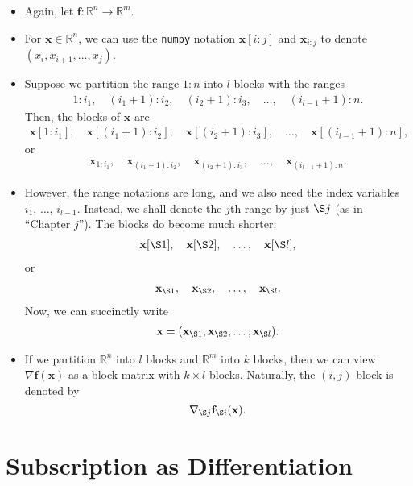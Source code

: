 \documentclass[10pt]{article}
\newcommand{\ve}[1]{\mathbf{#1}}
\newcommand{\Real}{\mathbb{R}}
\begin{document}
\begin{itemize}
  \item Again, let $\ve{f}: \Real^n \rightarrow \Real^m$. 
  
  \item For $\ve{x} \in \Real^n$, we can use the {\tt numpy} notation $\ve{x}[i:j]$ and $\ve{x}_{i:j}$ to denote $(x_i, x_{i+1}, \dotsc, x_j)$.
  
  \item Suppose we partition the range $1:n$ into $l$ blocks with the ranges
  \begin{align*}
    1:i_1, \quad (i_1+1):i_2, \quad (i_2+1):i_3, \quad \dotsc, \quad (i_{l-1}+1):n.
  \end{align*}
  Then, the blocks of $\ve{x}$ are
  \begin{align*}
    \ve{x}[1:i_1], \quad \ve{x}[(i_1+1):i_2], \quad \ve{x}[(i_2+1):i_3], \quad \dotsc, \quad \ve{x}[(i_{l-1}+1):n],
  \end{align*}
  or 
  \begin{align*}
    \ve{x}_{1:i_1}, \quad \ve{x}_{(i_1+1):i_2}, \quad \ve{x}_{(i_2+1):i_3}, \quad \dotsc, \quad \ve{x}_{(i_{l-1}+1):n}.
  \end{align*}

  \item However, the range notations are long, and we also need the index variables $i_1$, $\dotsc$, $i_{l-1}$. Instead, we shall denote the $j$th range by just $\S j$ (as in ``Chapter $j$''). The blocks do become much shorter:
  \begin{align*}
    \ve{x}[\S 1], \quad \ve{x}[\S 2], \quad \dotsc, \quad \ve{x}[\S l], 
  \end{align*}
  or 
  \begin{align*}
    \ve{x}_{\S 1}, \quad \ve{x}_{\S 2}, \quad \dotsc, \quad \ve{x}_{\S l}. 
  \end{align*}
  Now, we can succinctly write
  \begin{align*}
    \ve{x} = (\ve{x}_{\S1}, \ve{x}_{\S2}, \dotsc, \ve{x}_{\S l}).
  \end{align*}

  \item If we partition $\Real^n$ into $l$ blocks and $\Real^m$ into $k$ blocks, then we can view $\nabla \ve{f}(\ve{x})$ as a block matrix with $k \times l$ blocks. Naturally, the $(i,j)$-block is denoted by $$\nabla_{\S j} \ve{f}_{\S i}(\ve{x}).$$
\end{itemize}

\section{Subscription as Differentiation}
\end{document}
